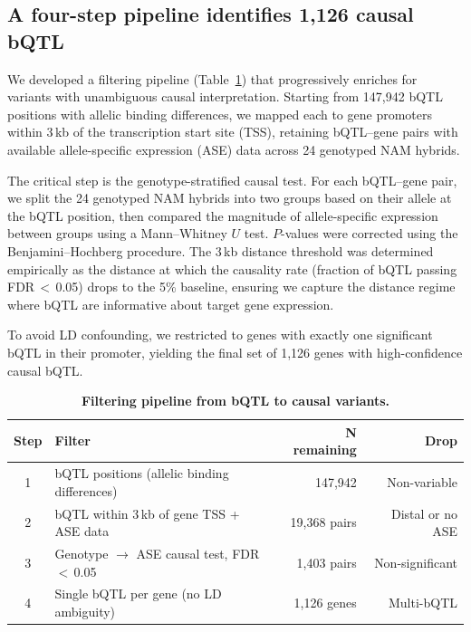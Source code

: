 \documentclass[11pt,a4paper]{article}
\begin{document}
\subsection{A four-step pipeline identifies 1,126 causal bQTL}
\label{sec:pipeline}

We developed a filtering pipeline (Table~\ref{tab:pipeline}) that
progressively enriches for variants with unambiguous causal interpretation.
Starting from 147,942 bQTL positions with allelic binding differences, we
mapped each to gene promoters within 3\,kb of the transcription start site
(TSS), retaining bQTL--gene pairs with available allele-specific expression
(ASE) data across 24 genotyped NAM hybrids.

The critical step is the genotype-stratified causal test. For each bQTL--gene
pair, we split the 24 genotyped NAM hybrids into two groups based on their
allele at the bQTL position, then compared the magnitude of allele-specific
expression between groups using a Mann--Whitney $U$ test. $P$-values were
corrected using the Benjamini--Hochberg procedure. The 3\,kb distance
threshold was determined empirically as the distance at which the causality
rate (fraction of bQTL passing FDR\,$<$\,0.05) drops to the 5\% baseline,
ensuring we capture the distance regime where bQTL are informative about
target gene expression.

To avoid LD confounding, we restricted to genes with exactly one significant
bQTL in their promoter, yielding the final set of 1,126 genes with
high-confidence causal bQTL.

\begin{table}[htb]
\centering
\caption{\textbf{Filtering pipeline from bQTL to causal variants.}}
\label{tab:pipeline}
\begin{tabular}{clrr}
\toprule
\textbf{Step} & \textbf{Filter} & \textbf{N remaining} & \textbf{Drop} \\
\midrule
1 & bQTL positions (allelic binding differences) & 147,942 & Non-variable \\
2 & bQTL within 3\,kb of gene TSS + ASE data & 19,368 pairs & Distal or no ASE \\
3 & Genotype $\to$ ASE causal test, FDR\,$<$\,0.05 & 1,403 pairs & Non-significant \\
4 & Single bQTL per gene (no LD ambiguity) & 1,126 genes & Multi-bQTL \\
\bottomrule
\end{tabular}
\end{table}
\end{document}
